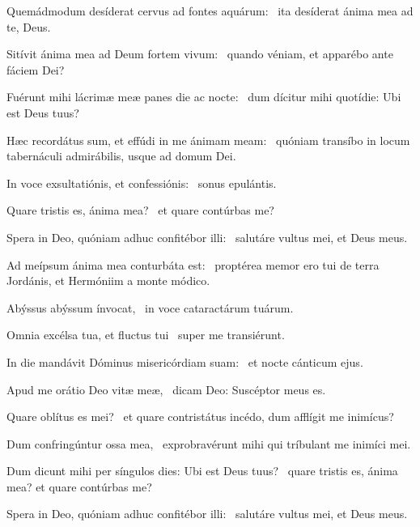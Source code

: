 \item Quemádmodum desíderat cervus ad fontes aquárum:~\psstar{} ita desíderat ánima mea ad te, Deus.

\item Sitívit ánima mea ad Deum fortem vivum:~\psstar{} quando véniam, et apparébo ante fáciem Dei?

\item Fuérunt mihi lácrimæ meæ panes die ac nocte:~\psstar{} dum dícitur mihi quotídie: Ubi est Deus tuus?

\item Hæc recordátus sum, et effúdi in me ánimam meam:~\psstar{} quóniam transíbo in locum tabernáculi admirábilis, usque ad domum Dei.

\item In voce exsultatiónis, et confessiónis:~\psstar{} sonus epulántis.

\item Quare tristis es, ánima mea?~\psstar{} et quare contúrbas me?

\item Spera in Deo, quóniam adhuc confitébor illi:~\psstar{} salutáre vultus mei, et Deus meus.

\item Ad meípsum ánima mea conturbáta est:~\psstar{} proptérea memor ero tui de terra Jordánis, et Hermóniim a monte módico.

\item Abýssus abýssum ínvocat,~\psstar{} in voce cataractárum tuárum.

\item Omnia excélsa tua, et fluctus tui~\psstar{} super me transiérunt.

\item In die mandávit Dóminus misericórdiam suam:~\psstar{} et nocte cánticum ejus.

\item Apud me orátio Deo vitæ meæ,~\psstar{} dicam Deo: Suscéptor meus es.

\item Quare oblítus es mei?~\psstar{} et quare contristátus incédo, dum afflígit me inimícus?

\item Dum confringúntur ossa mea,~\psstar{} exprobravérunt mihi qui tríbulant me inimíci mei.

\item Dum dicunt mihi per síngulos dies: Ubi est Deus tuus?~\psstar{} quare tristis es, ánima mea? et quare contúrbas me?

\item Spera in Deo, quóniam adhuc confitébor illi:~\psstar{} salutáre vultus mei, et Deus meus.
